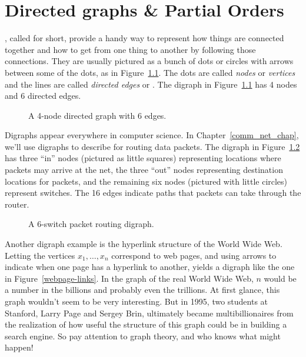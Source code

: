 \chapter{Directed graphs \& Partial Orders}\label{digraphs_chap}

, called  for short, provide a
handy way to represent how things are connected together and how to
get from one thing to another by following those connections.  They are
usually pictured as a bunch of dots or circles with arrows between
some of the dots, as in Figure~\ref{fig:4N6E}.  The dots are called
\emph{nodes} or \emph{vertices} and the lines are called
\emph{directed edges} or .  The digraph in
Figure~\ref{fig:4N6E} has 4 nodes and 6 directed edges.

\begin{figure}


\caption{A 4-node directed graph with 6 edges.}

\label{fig:4N6E}

\end{figure}

Digraphs appear everywhere in computer science.  In
Chapter~\ref{comm_net_chap}, we'll use digraphs to describe
 for routing data packets.  The digraph in
Figure~\ref{fig:6switchnet} has three ``in'' nodes (pictured as little
squares) representing locations where packets may arrive at the net,
the three ``out'' nodes representing destination locations for
packets, and the remaining six nodes (pictured with little circles)
represent switches.  The 16 edges indicate paths that packets can take
through the router.

\begin{figure}


\caption{A 6-switch packet routing digraph.}

\label{fig:6switchnet}
\end{figure}

Another digraph example is the hyperlink structure of the World Wide
Web.  Letting the vertices $x_1, \dots, x_n$ correspond to web pages,
and using arrows to indicate when one page has a hyperlink to another,
yields a digraph like the one in Figure~\ref{webpage-links}.  In the
graph of the real World Wide Web, $n$ would be a number in the
billions and probably even the trillions.  At first glance, this graph
wouldn't seem to be very interesting.  But in 1995, two students at
Stanford,  Larry Page and 
Sergey Brin, ultimately became multibillionaires from the realization
of how useful the structure of this graph could be in building a
search engine.  So pay attention to graph theory, and who knows what
might happen!

